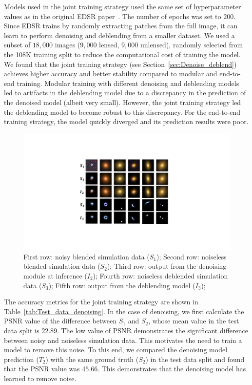 \documentclass[12pt, twocolumn, apj]{openjournal}
\begin{document}
Models used in the joint training strategy
used the same set of hyperparameter values as in the original EDSR paper~\citep{lim2017enhanced}. The number of epochs was set to $200$. Since EDSR trains by randomly extracting patches from the full image, it can learn to perform denoising and deblending from a smaller dataset. We used a subset of $18,000$ images ($9,000$ lensed, $9,000$ unlensed),  randomly selected from the 108K training split to reduce the computational cost of training the model. We found that the joint training strategy (see Section~\ref{sec:Denoise_deblend}) achieves higher accuracy and better stability compared to modular and end-to-end training. Modular training with different denoising and deblending models led to artifacts in the deblending model due to a discrepancy in the prediction of the denoised model (albeit very small). However, the joint training strategy led the deblending model to become robust to this discrepancy. For the end-to-end training strategy,  the model quickly diverged and its prediction results were poor.
\begin{figure}[!t]
\includegraphics[width=1\linewidth]{Figures/Images_Denoised_Deblended2.pdf} 
\caption{First row: noisy blended simulation data ($S_1$); Second row: noiseless blended simulation data ($S_2$); Third row: output from the denoising module at inference ($I_2$); Fourth row: noiseless deblended simulation data ($S_3$); Fifth row: output from the deblending model ($I_3$);} 
\label{Fig:Inference_deblend} 
\end{figure}

The accuracy metrics for the joint training strategy are shown in Table~\ref{tab:Test_data_denoising}. In the case of denoising, we first calculate the PSNR value of the difference between $S_1$ and $S_2$, whose mean value in the test data split is $22.89$. The low value of PSNR demonstrates the significant difference between noisy and noiseless simulation data. This motivates the need to train a model to remove this noise. To this end, we compared the denoising model prediction ($T_2$)  with the same ground truth ($S_2$) in the test data split and found that the PSNR value was $45.66$. This demonstrates that the denoising model has learned to remove noise.
\end{document}
